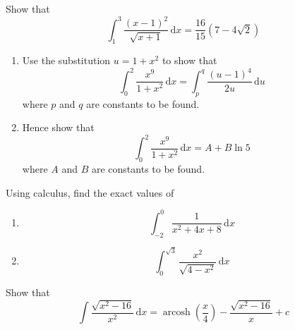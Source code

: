 \documentclass[leqno]{article}
\begin{document}
\djsFrontMatter
\begin{enumerate}[
  label=\textbf{\arabic*.},
  leftmargin=*,
  topsep=0pt,
  partopsep=0pt,
  parsep=0pt
]

\questionitem

Show that
\[
\int_1^3 \frac{(x-1)^2}{\sqrt{x+1}}\,\mathrm{d}x = \frac{16}{15}(7-4\sqrt{2})
\]

\newpage

\questionitem

\begin{enumerate}[label=\textbf{(\alph*)}]
  \item Use the substitution $u = 1 + x^2$ to show that
  \[
  \int_0^2 \frac{x^9}{1+x^2}\,\mathrm{d}x = \int_p^q \frac{(u-1)^4}{2u}\,\mathrm{d}u
  \]
  where $p$ and $q$ are constants to be found.  \\
  \item Hence show that
  \[
  \int_0^2 \frac{x^9}{1+x^2}\,\mathrm{d}x = A + B\ln 5
  \]
  where $A$ and $B$ are constants to be found.  \\
\end{enumerate}

\newpage

\questionitem

Using calculus, find the exact values of \\

\begin{enumerate}[label=(\roman*)]
  \item
  \[
  \int_{-2}^0 \frac{1}{x^2 + 4x + 8}\,\mathrm{d}x
  \]
  \item
  \[
  \int_0^{\sqrt{3}} \frac{x^2}{\sqrt{4 - x^2}}\,\mathrm{d}x
  \]
\end{enumerate}

\newpage

\questionitem

Show that
\[
\int \frac{\sqrt{x^2 - 16}}{x^2}\,\mathrm{d}x = \operatorname{arcosh}\left(\frac{x}{4}\right) - \frac{\sqrt{x^2 - 16}}{x} + c
\]

\newpage

\questionitem


\end{enumerate}
\end{document}
